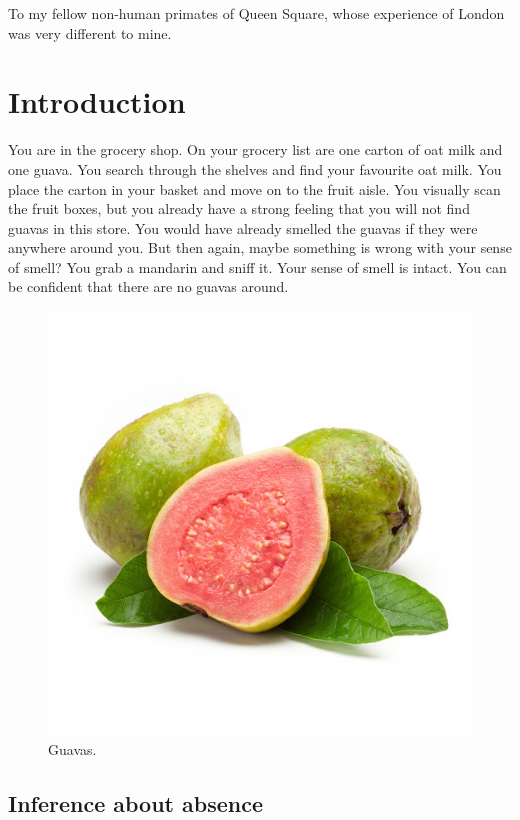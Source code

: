 \documentclass[12pt,twoside]{reedthesis}
\begin{document}
  \begin{dedication}
    To my fellow non-human primates of Queen Square, whose experience of London was very different to mine.
  \end{dedication}
\mainmatter %
\pagestyle{fancyplain} %

\hypertarget{introduction}{%
\chapter*{Introduction}\label{introduction}}

You are in the grocery shop. On your grocery list are one carton of oat milk and one guava. You search through the shelves and find your favourite oat milk. You place the carton in your basket and move on to the fruit aisle. You visually scan the fruit boxes, but you already have a strong feeling that you will not find guavas in this store. You would have already smelled the guavas if they were anywhere around you. But then again, maybe something is wrong with your sense of smell? You grab a mandarin and sniff it. Your sense of smell is intact. You can be confident that there are no guavas around.
\begin{figure}[!h]
\includegraphics[width=\textwidth]{figure/intro/guava} \caption[Guavas]{Guavas.}\label{fig:intro-guava}
\end{figure}
\hypertarget{inference-about-absence}{%
\section{Inference about absence}\label{inference-about-absence}}
\end{document}
